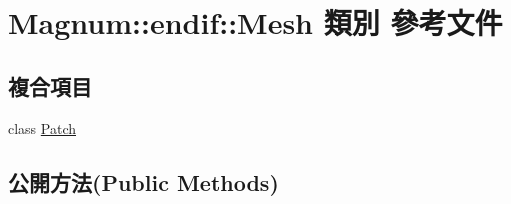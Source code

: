 \hypertarget{class_magnum_1_1endif_1_1_mesh}{}\section{Magnum\+:\+:endif\+:\+:Mesh 類別 參考文件}
\label{class_magnum_1_1endif_1_1_mesh}
\subsection*{複合項目}
\begin{DoxyCompactItemize}
\item 
class \hyperlink{class_magnum_1_1endif_1_1_mesh_1_1_patch}{Patch}
\end{DoxyCompactItemize}
\subsection*{公開方法(Public Methods)}
